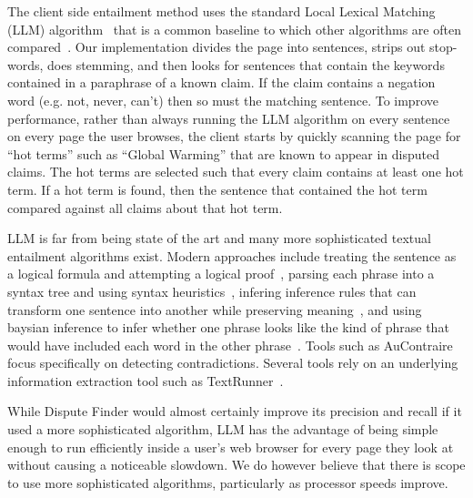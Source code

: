 \documentclass{www2010-submission}
\newcommand{\todo}[1]{}
\begin{document}
The client side entailment method uses the standard Local Lexical Matching (LLM) algorithm~\cite{Jijkoun2006} that is a common baseline to which other algorithms are often compared~\cite{Braz}. Our implementation divides the page into sentences, strips out stop-words, does stemming, and then looks for sentences that contain the keywords contained in a paraphrase of a known claim. If the claim contains a negation word (e.g. not, never, can't) then so must the matching sentence. To improve performance, rather than always running the LLM algorithm on every sentence on every page the user browses, the client starts by quickly scanning the page for ``hot terms'' such as ``Global Warming'' that are known to appear in disputed claims. The hot terms are selected such that every claim contains at least one hot term. If a hot term is found, then the sentence that contained the hot term compared against all claims about that hot term.

LLM is far from being state of the art and many more sophisticated textual entailment algorithms exist. Modern approaches include treating the sentence as a logical formula and attempting a logical proof~\cite{Bayer2001,Bos2005}, parsing each phrase into a syntax tree and using syntax heuristics~\cite{Snow2006}, infering inference rules that can transform one sentence into another while preserving meaning~\cite{Lin2002,Dinu2009,Bhagat2009}, and using baysian inference to infer whether one phrase looks like the kind of phrase that would have included each word in the other phrase~\cite{Glickman2005}. Tools such as AuContraire~\cite{Ritter} focus specifically on detecting contradictions. Several tools rely on an underlying information extraction tool such as TextRunner~\cite{Etzioni2008}.

While Dispute Finder would almost certainly improve its precision and recall if it used a more sophisticated algorithm, LLM has the advantage of being simple enough to run efficiently inside a user's web browser for every page they look at without causing a noticeable slowdown. We do however believe that there is scope to use more sophisticated algorithms, particularly as processor speeds improve.


\todo{Mention that we could add the +ve and -ve n-grams to the client code? Actually do this?}

\todo{Discuss how and why this is simpler than the server-side classification method}
\todo{Explain how we avoid downloading the entire database}

\todo{Should we have a version where the interface merely suggests n-grams that should be used by the classifier}
\todo{Can we present all these systems without giving detailed stats about how they compare?}
\todo{Add support for a user to enter 'anti-phrases' when a snippet is wrongly highlighted}
\todo{Add support for a user to enter a paraphrase that will match the snippet they are looking at}
\todo{Do a load more people in a final user-study round. Try to get it up to 8.}
\todo{Explain how our algorithm relates to existing NLP work - due to unusual domain}
\end{document}
